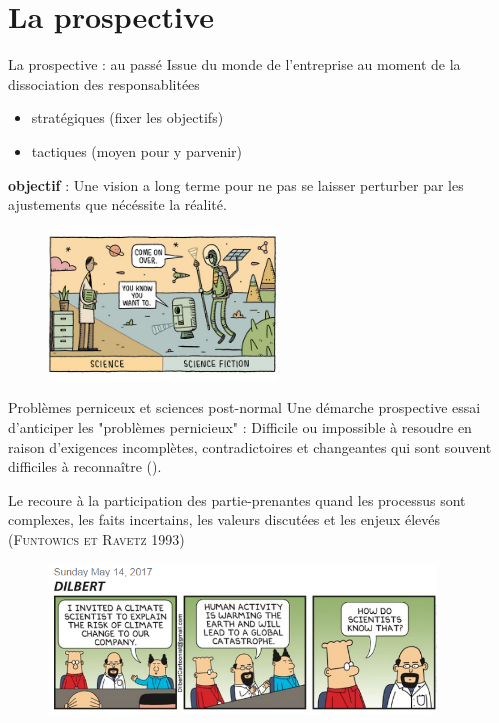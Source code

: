 \documentclass[newPxFont]{beamer}
\begin{document}
%
%
\section{La prospective}

\begin{frame}[c]{La prospective : au passé}
  \vspace{-2em}
  Issue du monde de l'entreprise au moment de la dissociation des responsablitées
  \begin{itemize}
    \item stratégiques (fixer les objectifs)
    \item tactiques (moyen pour y parvenir)
  \end{itemize}
  \textbf{objectif} : Une vision a long terme pour ne pas se laisser perturber par les ajustements que nécéssite la réalité.
  \begin{figure}
   \includegraphics[height=4cm]{img/a_gauld_tom_new_scientist.jpg}
  \end{figure}
\end{frame}

\begin{frame}[c]{Problèmes perniceux et sciences post-normal}
  \vspace{-2em}
  Une démarche prospective essai d'anticiper les "problèmes pernicieux" :  Difficile ou impossible à resoudre en raison d'exigences incomplètes, contradictoires et changeantes qui sont souvent difficiles à reconnaître ().

  Le recoure à la participation des partie-prenantes quand les processus sont complexes, les faits incertains, les valeurs discutées et les enjeux élevés (\textsc{Funtowics et Ravetz 1993})

  \begin{figure}
   \includegraphics[height=4cm]{img/a_dilbert-climate-science.png}
  \end{figure}
\end{frame}
\end{document}
